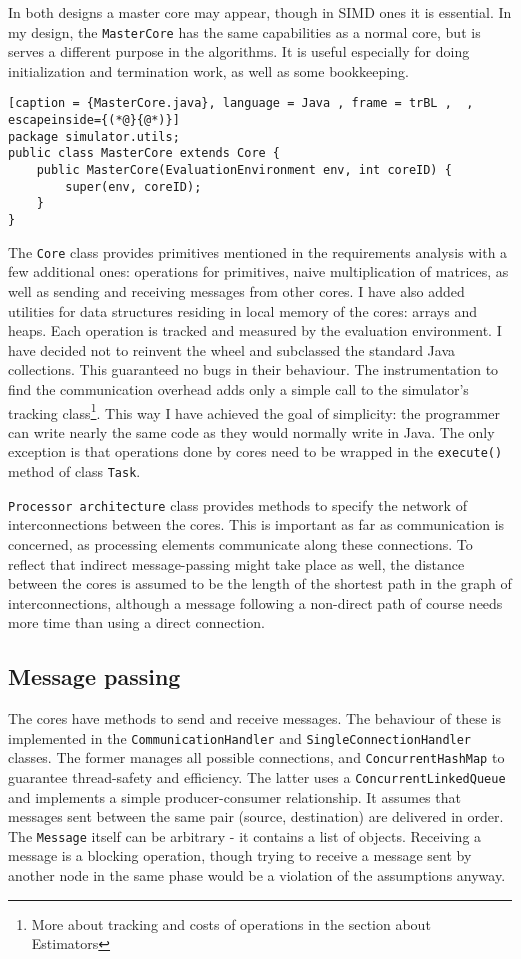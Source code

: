 \documentclass[12pt,a4paper,twoside,openright]{report}
\begin{document}
In both designs a master core may appear, though in SIMD ones it is essential. In my design, the \texttt{MasterCore} has the same capabilities as a normal core, but is serves a different purpose in the algorithms. It is useful especially for doing initialization and termination work, as well as some bookkeeping.

\begin{lstlisting}[caption = {MasterCore.java}, language = Java , frame = trBL ,  , escapeinside={(*@}{@*)}]
package simulator.utils;
public class MasterCore extends Core {
    public MasterCore(EvaluationEnvironment env, int coreID) {
        super(env, coreID);
    }
}
\end{lstlisting}

The \texttt{Core} class provides primitives mentioned in the requirements analysis with a few additional ones: operations for primitives, naive multiplication of matrices, as well as sending and receiving messages from other cores. I have also added utilities for data structures residing in local memory of the cores: arrays and heaps. Each operation is tracked and measured by the evaluation environment. I have decided not to reinvent the wheel and subclassed the standard Java collections. This guaranteed no bugs in their behaviour. The instrumentation to find the communication overhead adds only a simple call to the simulator's tracking class\footnote{More about tracking and costs of operations in the section about Estimators}. This way I have achieved the goal of simplicity: the programmer can write nearly the same code as they would normally write in Java. The only exception is that operations done by cores need to be wrapped in the \texttt{execute()} method of class \texttt{Task}.

\texttt{Processor architecture} class provides methods to specify the network of interconnections between the cores. This is important as far as communication is concerned, as processing elements communicate along these connections. To reflect that indirect message-passing might take place as well, the distance between the cores is assumed to be the length of the shortest path in the graph of interconnections, although a message following a non-direct path of course needs more time than using a direct connection.

\subsection{Message passing}
The cores have methods to send and receive messages. The behaviour of these is implemented in the \texttt{CommunicationHandler} and \texttt{SingleConnectionHandler} classes. The former manages all possible connections, and \texttt{ConcurrentHashMap} to guarantee thread-safety and efficiency. The latter uses a \texttt{ConcurrentLinkedQueue} and implements a simple producer-consumer relationship. It assumes that messages sent between the same pair (source, destination) are delivered in order. The \texttt{Message} itself can be arbitrary - it contains a list of objects. Receiving a message is a blocking operation, though trying to receive a message sent by another node in the same phase would be a violation of the assumptions anyway.
\end{document}
